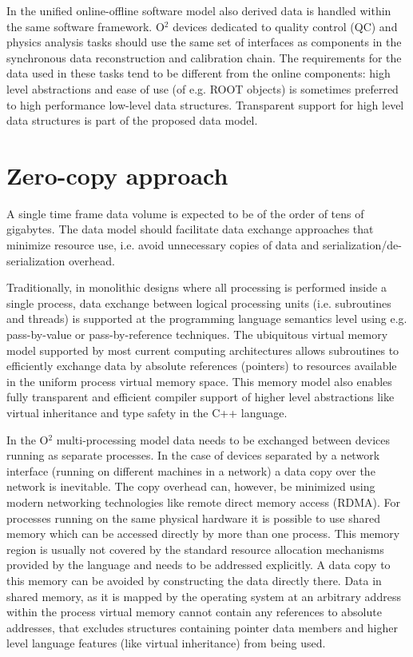 \documentclass[a4paper,twoside]{article}
\def\O2{O$^2$}
\begin{document}
In the unified online-offline software model also derived data is handled within the same software framework. \O2 devices dedicated to quality control (QC) and physics analysis tasks should use the same set of interfaces as components in the synchronous data reconstruction and calibration chain. The requirements for the data used in these tasks tend to be different from the online components: high level abstractions and ease of use (of e.g. ROOT\cite{root} objects) is sometimes preferred to high performance low-level data structures. Transparent support for high level data structures is part of the proposed data model.

\section{Zero-copy approach}

A single time frame data volume is expected to be of the order of tens of gigabytes. The data model should facilitate data exchange approaches that minimize resource use, i.e. avoid unnecessary copies of data and serialization/de-serialization overhead.

Traditionally, in monolithic designs where all processing is performed inside a single process, data exchange between logical processing units (i.e. subroutines and threads) is supported at the programming language semantics level using e.g. pass-by-value or pass-by-reference techniques.
The ubiquitous virtual memory model supported by most current computing architectures allows subroutines to efficiently exchange data by absolute references (pointers) to resources available in the uniform process virtual memory space.
This memory model also enables fully transparent and efficient compiler support of higher level abstractions like virtual inheritance and type safety in the C++ language.

In the \O2 multi-processing model data needs to be exchanged between devices running as separate processes. In the case of devices separated by a network interface (running on different machines in a network) a data copy over the network is inevitable. The copy overhead can, however, be minimized using modern networking technologies like remote direct memory access (RDMA). For processes running on the same physical hardware it is possible to use shared memory which can be accessed directly by more than one process. This memory region is usually not covered by the standard resource allocation mechanisms provided by the language and needs to be addressed explicitly. A data copy to this memory can be avoided by constructing the data directly there. Data in shared memory, as it is mapped by the operating system at an arbitrary address within the process virtual memory cannot contain any references to absolute addresses, that excludes structures containing pointer data members and higher level language features (like virtual inheritance) from being used. 
\end{document}
